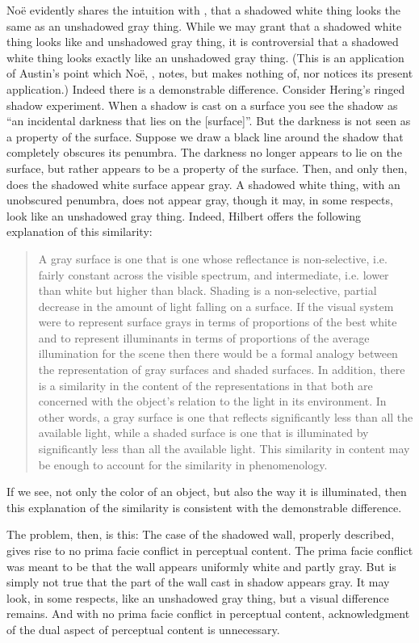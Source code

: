 \documentclass[12pt]{article}
\begin{document}
Noë evidently shares the intuition with \citet[88]{Chalmers:2006kx}, that a shadowed white thing looks the same as an unshadowed gray thing. While we may grant that a shadowed white thing looks like and unshadowed gray thing, it is controversial that a shadowed white thing looks exactly like an unshadowed gray thing. (This is an application of Austin's point which Noë, \citeyear[80]{Noe:2004fk}, notes, but makes nothing of, nor notices its present application.) Indeed there is a demonstrable difference. Consider Hering's \citeyearpar[8]{Hering:1920ty} ringed shadow experiment. When a shadow is cast on a surface you see the shadow as ``an incidental darkness that lies on the [surface]''. But the darkness is not seen as a property of the surface. Suppose we draw a black line around the shadow that completely obscures its penumbra. The darkness no longer appears to lie on the surface, but rather appears to be a property of the surface. Then, and only then, does the shadowed white surface appear gray. A shadowed white thing, with an unobscured penumbra, does not appear gray, though it may, in some respects, look like an unshadowed gray thing. Indeed, Hilbert offers the following explanation of this similarity:
	\begin{quote}
		A gray surface is one that is one whose reflectance is non-selective, i.e. fairly constant across the visible spectrum, and intermediate, i.e. lower than white but higher than black. Shading is a non-selective, partial decrease in the amount of light falling on a surface. If the visual system were to represent surface grays in terms of proportions of the best white and to represent illuminants in terms of proportions of the average illumination for the scene then there would be a formal analogy between the representation of gray surfaces and shaded surfaces. In addition, there is a similarity in the content of the representations in that both are concerned with the object’s relation to the light in its environment. In other words, a gray surface is one that reflects significantly less than all the available light, while a shaded surface is one that is illuminated by significantly less than all the available light. This similarity in content may be enough to account for the similarity in phenomenology. \citep[xx]{Hilbert:2007qy}
	\end{quote}
If we see, not only the color of an object, but also the way it is illuminated, then this explanation of the similarity is consistent with the demonstrable difference.

The problem, then, is this: The case of the shadowed wall, properly described, gives rise to no prima facie conflict in perceptual content. The prima facie conflict was meant to be that the wall appears uniformly white and partly gray. But is simply not true that the part of the wall cast in shadow appears gray. It may look, in some respects, like an unshadowed gray thing, but a visual difference remains. And with no prima facie conflict in perceptual content, acknowledgment of the dual aspect of perceptual content is unnecessary.
\end{document}
